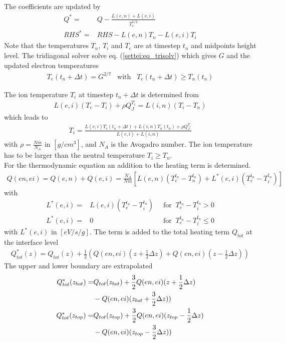 %
The coefficients are updated by
%
\begin{align}
  Q^* = & Q - \frac{L(e,n) + L(e,i)}{T_e^{5/2}} \\
  RHS^* = & RHS - L(e,n) T_n - L(e,i) T_i
\end{align}
%
Note that the temperatures $T_n$, $T_i$ and $T_e$ are at timestep
$t_n$ and midpoints height level. The tridiagonal solver solve
eq. (\ref{settei:eq_trisolv}) which gives $G$ and the updated
electron temperatures
%
\begin{align}
  T_e(t_n+\Delta t) = G^{2/7} \;\;\; \text{with} \;\;\; T_e(t_n+\Delta t) \geq T_n(t_n)
\end{align}
%

The ion temperature $T_i$ at timestep $t_n+\Delta t$ is determined
from
%
\begin{align}
  L(e,i) (T_e -T_i) + \rho Q_J^{T_i} = L(i,n)(T_i - T_n)
\end{align}
%
which leads to
%
\begin{align}
  T_i = \frac{L(e,i)T_e(t_n+\Delta t) + L(i,n)T_n(t_n) + \rho Q_J^{T_i}}{L(e,i)+L(i,n)}
\end{align}
%
with $\rho = \frac{N \overline{m}}{N_A}$ in $[g/cm^3]$,
and $N_A$ is the Avogadro number. The ion temperature has to be
larger than the neutral temperature $T_i \geq T_n$. \\

For the thermodynamic equation an addition to the heating term is determined.
%
\begin{align}
  Q(en,ei)=Q(e,n) + Q(e,i) = \frac{N_A}{N \overline{m}}\left[ L(e,n) (T_e^{t_n} - T_n^{t_n}) +
  L^*(e,i) (T_e^{t_n} - T_i^{t_n}) \right]
\end{align}
%
with
%
\begin{align}
  L^* (e,i) = &L(e,i)(T_e^{t_n} - T_i^{t_n}) \; \; & \text{for} \; \; T_e^{t_n} - T_i^{t_n} > 0 \\
  L^* (e,i) = &0                 \; \; & \text{for} \; \; T_e^{t_n} - T_i^{t_n} \leq 0
\end{align}
%
with $L^* (e,i)$ in $[eV/s/g]$. The term is added to the total heating term $Q_{tot}$
at the interface level
%
\begin{align}
  Q_{tot}^*(z) = Q_{tot}(z) + \frac{1}{2} (Q(en,ei)(z+\frac{1}{2} \Delta z) +
      Q(en,ei)(z-\frac{1}{2} \Delta z))
\end{align}
%
The upper and lower boundary are extrapolated
%
\begin{align}
  Q_{tot}^*(z_{bot}) = & Q_{tot}(z_{bot}) + \frac{3}{2} Q(en,ei)(z+\frac{1}{2} \Delta z) \notag \\
       {} & -Q(en,ei)(z_{bot}+\frac{3}{2} \Delta z)) \\
  Q_{tot}^*(z_{top}) = & Q_{tot}(z_{top}) + \frac{3}{2}
  Q(en,ei)(z_{top}-\frac{1}{2} \Delta z) \notag \\
       {} & -Q(en,ei)(z_{top}-\frac{3}{2} \Delta z))
\end{align}
%
